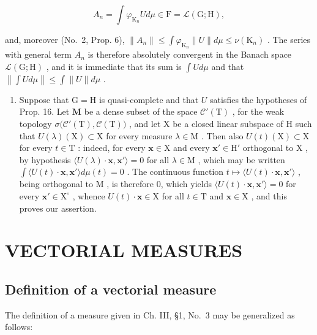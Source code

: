 \[
A _ {n} = \int \varphi_ {\mathrm{K} _ {n}} U d \mu \in \mathrm{F} = \mathcal {L} (\mathrm{G}; \mathrm{H}),
\]

and, moreover (No.~2, Prop. 6), \(\| A_n\| \leqslant \int \varphi_{\mathrm{K}_n}\| U\| d\mu \leqslant \nu (\mathrm{K}_n)\) . The series with general term \(A_{n}\) is therefore absolutely convergent in the Banach space \(\mathcal{L}(\mathrm{G};\mathrm{H})\) , and it is immediate that its sum is \(\int Ud\mu\) and that \(\left\| \int Ud\mu \right\| \leqslant \int \| U\| d\mu\) .

\begin{enumerate}
\def\labelenumi{\arabic{enumi})}
\setcounter{enumi}{1}
\tightlist
\item
  Suppose that \(\mathrm{G} = \mathrm{H}\) is quasi-complete and that \(U\) satisfies the hypotheses of Prop. 16. Let \(\mathbf{M}\) be a dense subset of the space \(\mathcal{C}'(\mathrm{T})\) , for the weak topology \(\sigma\big(\mathcal{C}'(\mathrm{T}),\mathcal{C}(\mathrm{T})\big)\) , and let \(\mathrm{X}\) be a closed linear subspace of \(\mathrm{H}\) such that \(U(\lambda)(\mathrm{X})\subset \mathrm{X}\) for every measure \(\lambda \in \mathrm{M}\) . Then also \(U(t)(\mathrm{X})\subset \mathrm{X}\) for every \(t\in \mathrm{T}\) : indeed, for every \(\mathbf{x}\in \mathrm{X}\) and every \(\mathbf{x}'\in \mathrm{H}'\) orthogonal to \(\mathrm{X}\) , by hypothesis \(\langle U(\lambda)\cdot \mathbf{x},\mathbf{x}'\rangle = 0\) for all \(\lambda \in \mathrm{M}\) , which may be written \(\int \langle U(t)\cdot \mathbf{x},\mathbf{x}'\rangle d\mu (t) = 0\) . The continuous function \(t\mapsto \langle U(t)\cdot \mathbf{x},\mathbf{x}'\rangle\) , being orthogonal to \(\mathrm{M}\) , is therefore 0, which yields \(\langle U(t)\cdot \mathbf{x},\mathbf{x}'\rangle = 0\) for every \(\mathbf{x}'\in \mathrm{X}^\circ\) , whence \(U(t)\cdot \mathbf{x}\in \mathrm{X}\) for all \(t\in \mathrm{T}\) and \(\mathbf{x}\in \mathrm{X}\) , and this proves our assertion.
\end{enumerate}

\section{VECTORIAL MEASURES}

\subsection{Definition of a vectorial measure}

The definition of a measure given in Ch. III, §1, No.~3 may be generalized as follows:


